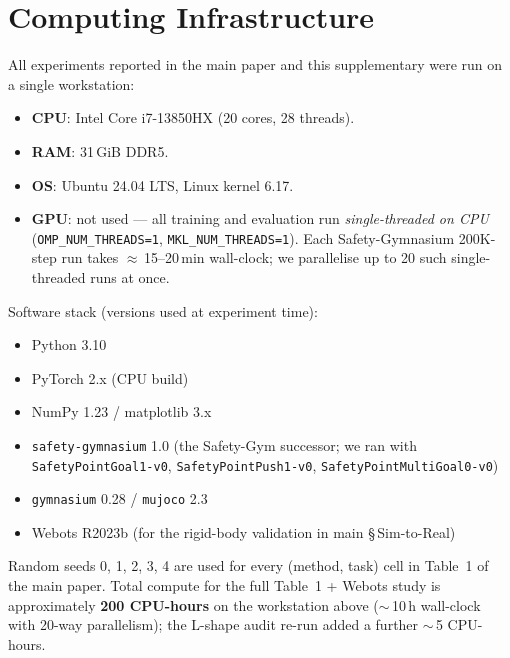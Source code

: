 \documentclass[letterpaper]{article}
\begin{document}
\section{Computing Infrastructure}
\label{sec:infra}

All experiments reported in the main paper and this supplementary were run on a single workstation:

\begin{itemize}\setlength{\itemsep}{0pt}
\item \textbf{CPU}: Intel Core i7-13850HX (20 cores, 28 threads).
\item \textbf{RAM}: 31\,GiB DDR5.
\item \textbf{OS}: Ubuntu 24.04 LTS, Linux kernel 6.17.
\item \textbf{GPU}: not used --- all training and evaluation run \emph{single-threaded on CPU} (\texttt{OMP\_NUM\_THREADS=1}, \texttt{MKL\_NUM\_THREADS=1}). Each Safety-Gymnasium 200K-step run takes $\approx$\,15--20\,min wall-clock; we parallelise up to 20 such single-threaded runs at once.
\end{itemize}

Software stack (versions used at experiment time):

\begin{itemize}\setlength{\itemsep}{0pt}
\item Python 3.10
\item PyTorch 2.x (CPU build)
\item NumPy 1.23 / matplotlib 3.x
\item \texttt{safety-gymnasium} 1.0 (the Safety-Gym successor; we ran with \texttt{SafetyPointGoal1-v0}, \texttt{SafetyPointPush1-v0}, \texttt{SafetyPointMultiGoal0-v0})
\item \texttt{gymnasium} 0.28 / \texttt{mujoco} 2.3
\item Webots R2023b (for the rigid-body validation in main \S\,Sim-to-Real)
\end{itemize}

Random seeds 0, 1, 2, 3, 4 are used for every (method, task) cell in Table~1 of the main paper. Total compute for the full Table~1 + Webots study is approximately \textbf{200 CPU-hours} on the workstation above ($\sim$\,10\,h wall-clock with 20-way parallelism); the L-shape audit re-run added a further $\sim$\,5 CPU-hours.
\end{document}
